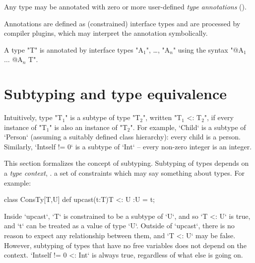 
        Any \Xten{} type may be annotated with zero or more
        user-defined \emph{type annotations}
        ().  

        Annotations are defined as (constrained) interface types and are
        processed by compiler plugins, which may interpret the
        annotation symbolically.

        A type \xcd"T" is annotated by interface types
        \xcdmath"A$_1$", \dots,
        \xcdmath"A$_n$"
        using the syntax
        \xcdmath"@A$_1$ $\dots$ @A$_n$ T".

\section{Subtyping and type equivalence}\label{DepType:Equivalence}

Intuitively, type \xcdmath"T$_1$" is a subtype of type \xcdmath"T$_2$", 
written \xcdmath"T$_1$ <: T$_2$", 
if
every instance of \xcdmath"T$_1$" is also an instance of \xcdmath"T$_2$".  For
example, \xcd`Child` is a subtype of \xcd`Person` (assuming a suitably defined
class hierarchy): every child is a person.  Similarly, \xcd`Int{self != 0}`
is a subtype of \xcd`Int` -- every non-zero integer is an integer.  

This section formalizes the concept of subtyping. Subtyping of types depends
on a {\em type context}, \viz. a set of constraints which may say something
about types.   For example: 

\begin{xten}
class ConsTy[T,U] {
   def upcast(t:T){T <: U} :U = t;
}
\end{xten}
%
\noindent
Inside \xcd`upcast`, \xcd`T` is constrained to be a subtype of \xcd`U`, and so
\xcd`T <: U` is true, and \xcd`t` can be treated as a value of type \xcd`U`.  
Outside of \xcd`upcast`, there is no reason to expect any relationship between
them, and \xcd`T <: U` may be false.
However, subtyping of types that have no free variables does not depend
on the context.    \xcd`Int{self != 0} <: Int` is always
true, regardless of what else is going on.




